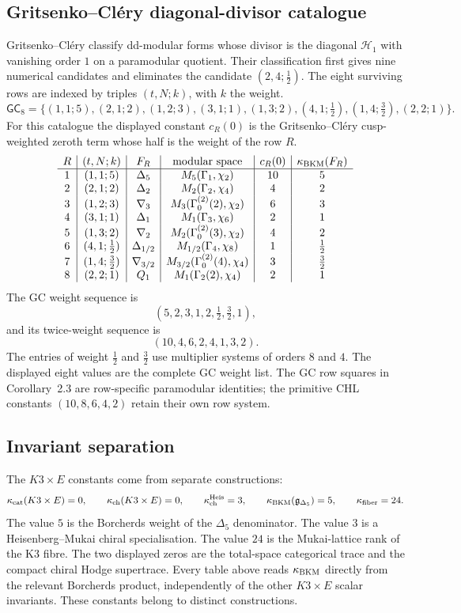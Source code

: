 \subsection*{Gritsenko--Cl\'ery diagonal-divisor catalogue}

Gritsenko--Cl\'ery classify dd-modular forms whose divisor is the diagonal
$\mathcal H_1$ with vanishing order $1$ on a paramodular quotient.  Their
classification first gives nine numerical candidates and eliminates the
candidate $(2,4;\tfrac12)$.  The eight surviving rows are indexed by
triples $(t,N;k)$, with $k$ the weight.
\[
\mathsf{GC}_8=
\{(1,1;5),(2,1;2),(1,2;3),(3,1;1),(1,3;2),
(4,1;\tfrac12),(1,4;\tfrac32),(2,2;1)\}.
\]
For this catalogue the displayed constant $c_R(0)$ is the
Gritsenko--Cl\'ery cusp-weighted zeroth term whose half is the weight of
the row $R$.
\[
\begin{array}{c|c|c|c|c|c}
R & (t,N;k) & F_R & \text{modular space} & c_R(0) & \kappa_{\mathrm{BKM}}(F_R)\\ \hline
1 & (1,1;5) & \Delta_5 & M_5(\Gamma_1,\chi_2) & 10 & 5\\
2 & (2,1;2) & \Delta_2 & M_2(\Gamma_2,\chi_4) & 4 & 2\\
3 & (1,2;3) & \nabla_3 & M_3(\Gamma_0^{(2)}(2),\chi_2) & 6 & 3\\
4 & (3,1;1) & \Delta_1 & M_1(\Gamma_3,\chi_6) & 2 & 1\\
5 & (1,3;2) & \nabla_2 & M_2(\Gamma_0^{(2)}(3),\chi_2) & 4 & 2\\
6 & (4,1;\tfrac12) & \Delta_{1/2} & M_{1/2}(\Gamma_4,\chi_8) & 1 & \tfrac12\\
7 & (1,4;\tfrac32) & \nabla_{3/2} &
  M_{3/2}(\Gamma_0^{(2)}(4),\chi_4) & 3 & \tfrac32\\
8 & (2,2;1) & Q_1 & M_1(\Gamma_2(2),\chi_4) & 2 & 1
\end{array}
\]
The GC weight sequence is
\[
  (5,2,3,1,2,\tfrac12,\tfrac32,1),
\]
and its twice-weight sequence is
\[
  (10,4,6,2,4,1,3,2).
\]
The entries of weight $\tfrac12$ and $\tfrac32$ use multiplier systems of
orders $8$ and $4$.  The displayed eight values are the complete GC
weight list.  The GC row squares in Corollary~2.3 are row-specific
paramodular identities; the primitive CHL constants $(10,8,6,4,2)$
retain their own row system.

\subsection*{Invariant separation}

The $K3\times E$ constants come from separate constructions:
\[
  \kappa_{\mathrm{cat}}(K3\times E)=0,\qquad
  \kappa_{\mathrm{ch}}(K3\times E)=0,\qquad
  \kappa_{\mathrm{ch}}^{\mathrm{Heis}}=3,\qquad
  \kappa_{\mathrm{BKM}}(\mathfrak g_{\Delta_5})=5,\qquad
  \kappa_{\mathrm{fiber}}=24.
\]
The value $5$ is the Borcherds weight of the $\Delta_5$ denominator.
The value $3$ is a Heisenberg--Mukai chiral specialisation.  The value
$24$ is the Mukai-lattice rank of the K3 fibre.  The two displayed
zeros are the total-space categorical trace and the compact chiral
Hodge supertrace.  Every table above reads $\kappa_{\mathrm{BKM}}$ directly from the
relevant Borcherds product, independently of the other $K3\times E$
scalar invariants.  These constants belong to distinct constructions.

